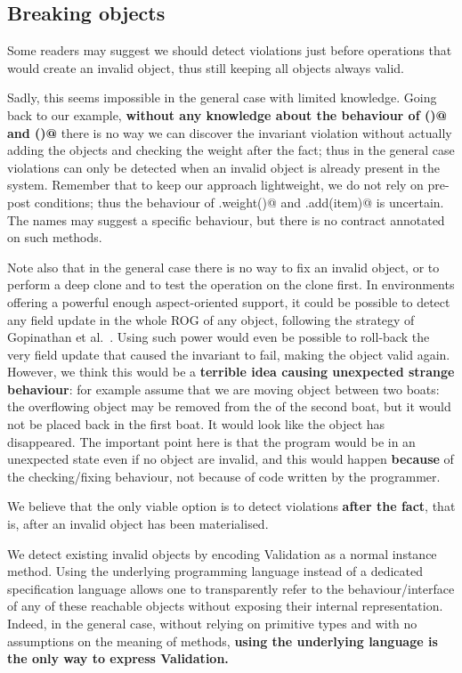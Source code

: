 \subsection{Breaking objects}
\saveSpace

Some readers may suggest we should detect violations just before operations that would create an invalid object,
thus still keeping all objects always valid.

Sadly, this seems impossible in the general case with limited knowledge.
Going back to our \Q@Boat@ example,
\textbf{without any knowledge about the behaviour of \Q@add()@ and \Q@weight()@}%
there is no way we can discover the invariant violation without actually adding the objects and checking the 
weight after the fact; thus in the general case violations can only be detected 
when an invalid object is already present in the system.
Remember that to keep our approach lightweight,
we do not rely on pre-post conditions; thus
the behaviour of \Q@Items.weight()@ and \Q@Items.add(item)@ is uncertain.
The names may suggest a specific behaviour, but there is no contract annotated on such methods.

Note also that in the general case there is no way to fix an invalid object,
or to perform a deep clone and to test the operation on the clone first.
In environments offering a powerful enough aspect-oriented support,
it could be possible to detect any field update in the whole ROG of
any object, following the strategy of 
Gopinathan et al.~\cite{Gopinathan:2008:RMO:1483018.1483028}.
Using such power would even be possible to roll-back the very field update that caused 
the invariant to fail, making the object valid again.
However, we think this would be a \textbf{terrible idea causing unexpected strange behaviour}: for example
assume that we are moving object between two boats:
the overflowing object may be removed from the \Q@cargo@ of the second boat, but it would not
be placed back in the first boat. It would look like the object has disappeared.
The important point here is that the program would be in an unexpected state
even if no object are invalid, and this would happen \textbf{because} of the 
checking/fixing behaviour, not because of code written by the programmer.

We believe that the only viable option is to detect violations 
\textbf{after the fact}, that is,
after an invalid object has been materialised.


We detect existing invalid objects by encoding Validation as a normal instance method.
Using the underlying programming language instead of a dedicated specification language allows one to transparently refer to the behaviour/interface of any of these reachable objects without exposing their internal representation.
Indeed, in the general case, without relying on primitive types and with no assumptions on the meaning of methods,
\textbf{using the underlying language is the only way to express Validation.}




